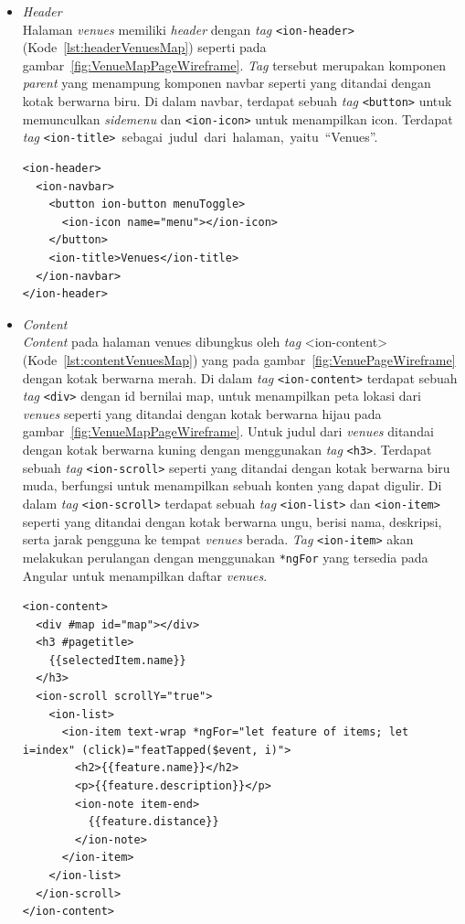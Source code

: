 \begin{enumerate}
\begin{enumerate}
	\begin{itemize}
		\item \textit{Header} \\
		 Halaman \textit{venues} memiliki \textit{header} dengan \textit{tag} \texttt{<ion-header>} (Kode~\ref{lst:headerVenuesMap}) seperti pada gambar~\ref{fig:VenueMapPageWireframe}. \textit{Tag} tersebut merupakan komponen \textit{parent} yang menampung komponen navbar seperti yang ditandai dengan kotak berwarna biru. Di dalam navbar, terdapat sebuah \textit{tag} \texttt{<button>} untuk memunculkan \textit{sidemenu} dan \texttt{<ion-icon>} untuk menampilkan icon. Terdapat \textit{tag} \texttt{<ion-title>}~sebagai~judul~dari~halaman,~yaitu~``Venues''.
		
\begin{lstlisting}[label={lst:headerVenuesMap}, caption=\textit{Header} pada venues\textunderscore map.html]
<ion-header>
  <ion-navbar>
    <button ion-button menuToggle>
      <ion-icon name="menu"></ion-icon>
    </button>
    <ion-title>Venues</ion-title>
  </ion-navbar>
</ion-header>
\end{lstlisting}

		\item \textit{Content} \\
		\textit{Content} pada halaman venues dibungkus oleh \textit{tag} <ion-content> (Kode~\ref{lst:contentVenuesMap}) yang pada gambar~\ref{fig:VenuePageWireframe} dengan kotak berwarna merah. Di dalam \textit{tag} \texttt{<ion-content>} terdapat sebuah \textit{tag} \texttt{<div>} dengan id bernilai map, untuk menampilkan peta lokasi dari \textit{venues} seperti yang ditandai dengan kotak berwarna hijau pada gambar~\ref{fig:VenueMapPageWireframe}. Untuk judul dari \textit{venues} ditandai dengan kotak berwarna kuning dengan menggunakan \textit{tag} \texttt{<h3>}. Terdapat sebuah \textit{tag} \texttt{<ion-scroll>} seperti yang ditandai dengan kotak berwarna biru muda, berfungsi untuk menampilkan sebuah konten yang dapat digulir. Di dalam \textit{tag} \texttt{<ion-scroll>} terdapat sebuah \textit{tag} \texttt{<ion-list>} dan \texttt{<ion-item>} seperti yang ditandai dengan kotak berwarna ungu, berisi nama, deskripsi, serta jarak pengguna ke tempat \textit{venues} berada. \textit{Tag} \texttt{<ion-item>} akan melakukan perulangan dengan menggunakan \texttt{*ngFor} yang tersedia pada Angular untuk menampilkan daftar \textit{venues}.
		
\begin{lstlisting}[label={lst:contentVenuesMap}, caption=\textit{Content} pada venues\textunderscore map.html]
<ion-content>
  <div #map id="map"></div>
  <h3 #pagetitle>
    {{selectedItem.name}}
  </h3>
  <ion-scroll scrollY="true">
    <ion-list>
      <ion-item text-wrap *ngFor="let feature of items; let i=index" (click)="featTapped($event, i)">
        <h2>{{feature.name}}</h2>
        <p>{{feature.description}}</p>
        <ion-note item-end>
          {{feature.distance}}
        </ion-note>
      </ion-item>
    </ion-list>
  </ion-scroll>
</ion-content>
\end{lstlisting}


\end{itemize}
\end{enumerate}
\end{enumerate}
